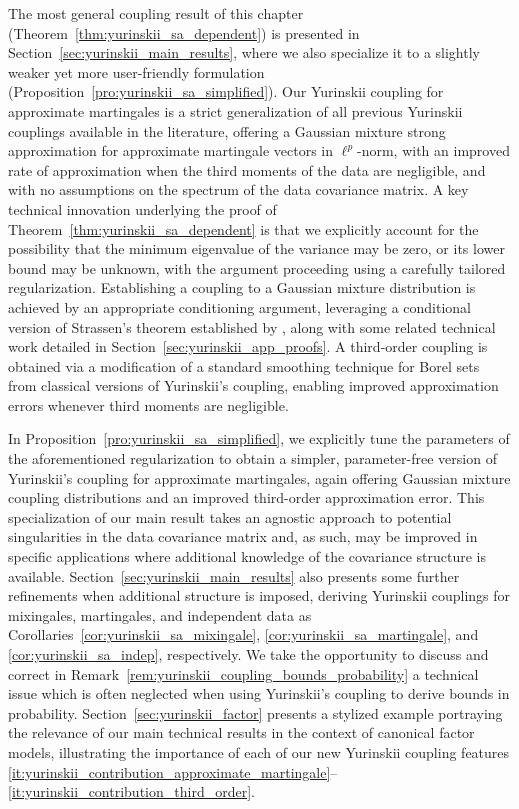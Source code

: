 \documentclass[11pt,lof]{puthesis}
\theoremstyle{break}
\theoremstyle{proof}
\begin{document}
The most general coupling result of this chapter
(Theorem~\ref{thm:yurinskii_sa_dependent}) is presented in
Section~\ref{sec:yurinskii_main_results}, where we also specialize it to a
slightly
weaker yet more user-friendly formulation
(Proposition~\ref{pro:yurinskii_sa_simplified}). Our Yurinskii coupling for
approximate
martingales is a strict generalization of all previous Yurinskii couplings
available in the literature, offering a Gaussian mixture strong approximation
for approximate martingale vectors in $\ell^p$-norm, with an improved rate of
approximation when the third moments of the data are negligible, and with no
assumptions on the spectrum of the data covariance matrix. A key technical
innovation underlying the proof of Theorem~\ref{thm:yurinskii_sa_dependent} is
that we
explicitly account for the possibility that the minimum eigenvalue of the
variance may be zero, or its lower bound may be unknown, with the argument
proceeding using a carefully tailored regularization. Establishing a coupling
to a Gaussian mixture distribution is achieved by an appropriate conditioning
argument, leveraging a conditional version of Strassen's theorem established by
\citet{chen2020jackknife}, along with some related technical work detailed in
Section~\ref{sec:yurinskii_app_proofs}.
A third-order coupling is obtained via
a modification of a standard smoothing technique for Borel sets from classical
versions of Yurinskii's coupling, enabling improved approximation errors
whenever third moments are negligible.

In Proposition~\ref{pro:yurinskii_sa_simplified}, we explicitly tune the
parameters of
the aforementioned regularization to obtain a simpler, parameter-free version
of Yurinskii's coupling for approximate martingales, again offering Gaussian
mixture coupling distributions and an improved third-order approximation error.
This specialization of our main result takes an agnostic approach to potential
singularities in the data covariance matrix and, as such, may be improved in
specific applications where additional knowledge of the covariance structure is
available. Section~\ref{sec:yurinskii_main_results} also presents some further
refinements when additional structure is imposed, deriving Yurinskii couplings
for mixingales, martingales, and independent data as
Corollaries~\ref{cor:yurinskii_sa_mixingale},
\ref{cor:yurinskii_sa_martingale}, and
\ref{cor:yurinskii_sa_indep}, respectively. We take the opportunity to discuss
and correct
in Remark~\ref{rem:yurinskii_coupling_bounds_probability} a technical issue
which is
often neglected \citep{pollard2002user, li2020uniform} when using Yurinskii's
coupling to derive bounds in probability. Section~\ref{sec:yurinskii_factor}
presents a
stylized example portraying the relevance of our main technical results in the
context of canonical factor models, illustrating the importance of each of our
new Yurinskii coupling features
\ref{it:yurinskii_contribution_approximate_martingale}--%
\ref{it:yurinskii_contribution_third_order}.
\end{document}
